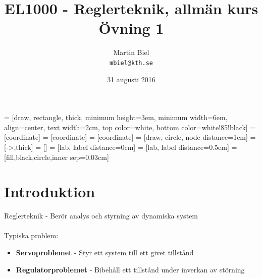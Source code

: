 \documentclass[12pt]{article}
\begin{document}
\begin{titlepage}
\author{Martin Biel \\ \texttt{mbiel@kth.se}}
\title{EL1000 - Reglerteknik, allmän kurs \\ \Large Övning 1}
\date{31 augusti 2016}
\end{titlepage}

 = [draw, rectangle, thick, minimum height=3em, minimum width=6em, align=center, text width=2cm, top color=white, bottom color=white!85!black]
 = [coordinate]
 = [coordinate]
 = [coordinate]
 = [draw, circle, node distance=1cm]
 = [->,thick]
 = []
 = [lab, label distance=0cm]
 = [lab, label distance=0.5em]
 = [fill,black,circle,inner sep=0.03cm]

\maketitle

\section*{Introduktion}

Reglerteknik - Berör analys och styrning av dynamiska system \\\\
Typiska problem:
\begin{itemize}
	\item \textbf{Servoproblemet} - Styr ett system till ett givet tillstånd 
	\item \textbf{Regulatorproblemet} - Bibehåll ett tillstånd under inverkan av störning
\end{itemize}
\end{document}
